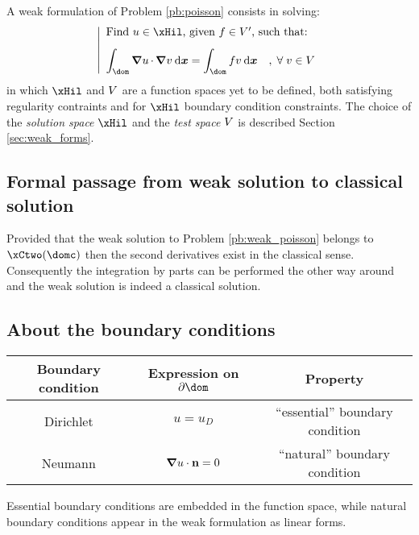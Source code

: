 \medskip
A weak formulation of Problem \eqref{pb:poisson} consists in solving:
\begin{equation}\label{pb:weak_poisson}
\left\lvert
\begin{array}{ll}
\mbox{Find $u \in \xHil$, given $f \in \xV'$, such that:}\\[2ex]
\displaystyle\int_\dom \Grad u\xDot \Grad v\dxx = \int_\dom f v  \dxx\quad,\;\forany  v\in \xV
\end{array}
\right .
\end{equation}
in which $\xHil$ and ${V}$ are a function spaces yet to be defined, both satisfying regularity contraints and for $\xHil$ boundary condition constraints.
The choice of the \textit{solution space} $\xHil$ and the \textit{test space} ${V}$ is described Section \ref{sec:weak_forms}.

\subsection{Formal passage from weak solution to classical solution}

Provided that the weak solution to Problem \eqref{pb:weak_poisson} belongs to $\xCtwo(\domc)$ then the second derivatives exist in the classical sense.
Consequently the integration by parts can be performed the other way around and the weak solution is indeed a classical solution.

\subsection{About the boundary conditions}\label{sssec:bcs}

\begin{center}
\begin{tabular}[width=0.5\textwidth]{|c|c|c|}
\hline
Boundary condition & Expression on $\partial\dom$ & Property \\
\hline
\hline
Dirichlet     & $u = u_D$             & ``essential'' boundary condition \\
Neumann       & ${\boldsymbol\nabla} u\cdot\mathbf n = 0$ &  ``natural'' boundary condition  \\
\hline
\end{tabular}
\end{center}

Essential boundary conditions are embedded in the function space, while natural boundary conditions appear in the weak formulation as linear forms.


